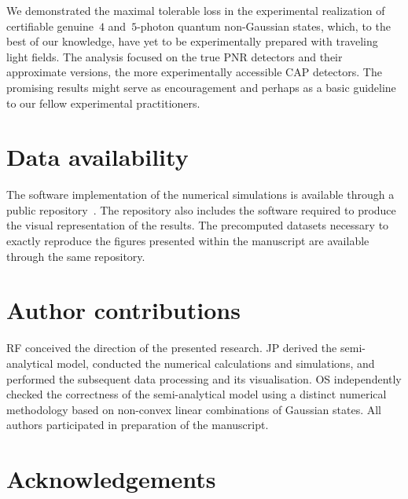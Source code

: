 \documentclass{article}
\begin{document}
We demonstrated the maximal tolerable loss in the experimental realization of certifiable genuine~$4$ and~$5$-photon quantum non-Gaussian states, which, to the best of our knowledge, have yet to be experimentally prepared with traveling light fields. The analysis focused on the true PNR detectors and their approximate versions, the more experimentally accessible CAP detectors. The promising results might serve as encouragement and perhaps as a basic guideline to our fellow experimental practitioners.

%

\FloatBarrier
\section*{Data availability}

The software implementation of the numerical simulations is available through a public repository~\cite{source}. The repository also includes the software required to produce the visual representation of the results. The precomputed datasets necessary to exactly reproduce the figures presented within the manuscript are available through the same repository.

\FloatBarrier
\section*{Author contributions}
RF conceived the direction of the presented research. JP derived the semi-analytical model, conducted the numerical calculations and simulations, and performed the subsequent data processing and its visualisation. OS independently checked the correctness of the semi-analytical model using a distinct numerical methodology based on non-convex linear combinations of Gaussian states. All authors participated in preparation of the manuscript.

\FloatBarrier
\section*{Acknowledgements}
\end{document}
